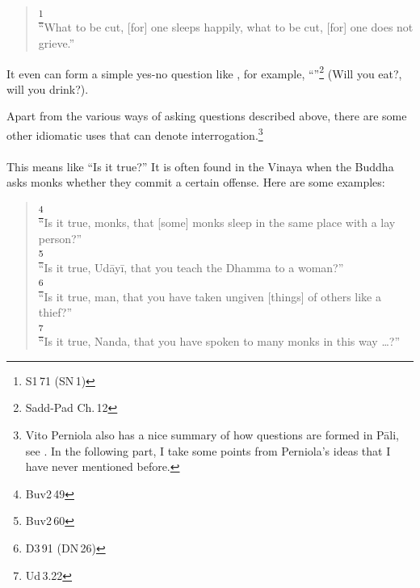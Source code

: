\begin{quote}
\footnote{S1\,71 (SN\,1)} \\
``What to be cut, [for] one sleeps happily, what to be cut, [for] one does not grieve.''
\end{quote}

It even can form a simple yes-no question like , for example, ``''\footnote{Sadd-Pad Ch.\,12} (Will you eat?, will you drink?).

\bigskip
Apart from the various ways of asking questions described above, there are some other idiomatic uses that can denote interrogation.\footnote{Vito Perniola also has a nice summary of how questions are formed in P\=ali, see \citealp[pp.~388--90]{perniola:grammar}. In the following part, I take some points from Perniola's ideas that I have never mentioned before.}

\paragraph*{} This means like ``Is it true?'' It is often found in the Vinaya when the Buddha asks monks whether they commit a certain offense. Here are some examples:

\begin{quote}
\footnote{Buv2\,49}\\
``Is it true, monks, that [some] monks sleep in the same place with a lay person?''\\[1.5mm]
\footnote{Buv2\,60}\\
``Is it true, Ud\=ay\=i, that you teach the Dhamma to a woman?''\\[1.5mm]
\footnote{D3\,91 (DN\,26)}\\
``Is it true, man, that you have taken ungiven [things] of others like a thief?''\\[1.5mm]
\footnote{Ud\,3.22}\\
``Is it true, Nanda, that you have spoken to many monks in this way \ldots?''\\[1.5mm]
\end{quote}

